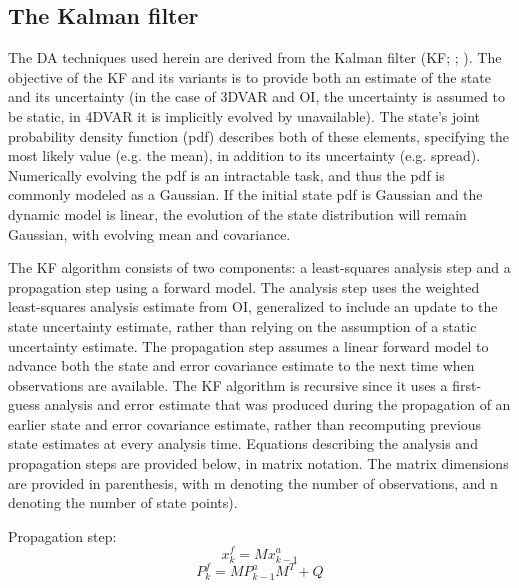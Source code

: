 \subsection{The Kalman filter}
\label{section_kf}
The DA techniques used herein are derived from the Kalman filter (KF; \citealt{kalman60}; \citealt{kalmanbucy61}). The objective of the KF and its variants is to provide both an estimate of the state and its uncertainty (in the case of 3DVAR and OI, the uncertainty is assumed to be static, in 4DVAR it is implicitly evolved by unavailable). The state’s joint probability density function (pdf) describes both of these elements, specifying the most likely value (e.g. the mean), in addition to its uncertainty (e.g. spread). Numerically evolving the pdf is an intractable task, and thus the pdf is commonly modeled as a Gaussian. If the initial state pdf is Gaussian and the dynamic model is linear, the evolution of the state distribution will remain Gaussian, with evolving mean and covariance.

The KF algorithm consists of two components: a least-squares analysis step and a propagation step using a forward model. The analysis step uses the weighted least-squares analysis estimate from OI, generalized to include an update to the state uncertainty estimate, rather than relying on the assumption of a static uncertainty estimate. The propagation step assumes a linear forward model to advance both the state and error covariance estimate to the next time when observations are available. The KF algorithm is recursive since it uses a first-guess analysis and error estimate that was produced during the propagation of an earlier state and error covariance estimate, rather than recomputing previous state estimates at every analysis time. Equations describing the analysis and propagation steps are provided below, in matrix notation. The matrix dimensions are provided in parenthesis, with m denoting the number of observations, and n denoting the number of state points).

\noindent Propagation step:
\begin{equation}
   x_k^f = Mx_{k-1}^a
\label{OI1}
\end{equation}
\begin{equation}
\label{coveqn1}
   P_k^f = MP_{k-1}^{a}M^T + Q
\end{equation}

